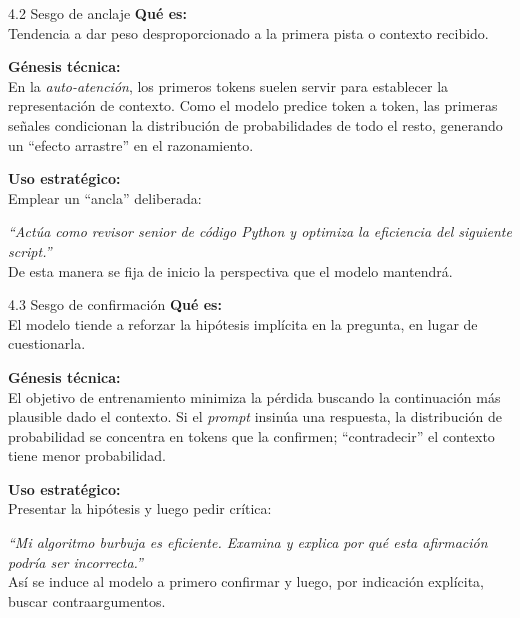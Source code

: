 \documentclass[xcolor=svgnames,t]{beamer}
\begin{document}
\begin{frame}{4.2 Sesgo de anclaje}
\justifying
\textbf{Qué es:}\\
Tendencia a dar peso desproporcionado a la primera pista o contexto recibido.

\medskip
\textbf{Génesis técnica:}\\
En la \textit{auto-atención}, los primeros tokens suelen servir para establecer la representación de contexto. Como el modelo predice token a token, las primeras señales condicionan la distribución de probabilidades de todo el resto, generando un “efecto arrastre” en el razonamiento.

\medskip
\textbf{Uso estratégico:}\\
Emplear un “ancla” deliberada:

\medskip
\textit{“Actúa como revisor senior de código Python y optimiza la eficiencia del siguiente script.”}\\
De esta manera se fija de inicio la perspectiva que el modelo mantendrá.
\end{frame}

\begin{frame}{4.3 Sesgo de confirmación}
\justifying
\textbf{Qué es:}\\
El modelo tiende a reforzar la hipótesis implícita en la pregunta, en lugar de cuestionarla.

\medskip
\textbf{Génesis técnica:}\\
El objetivo de entrenamiento minimiza la pérdida buscando la continuación más plausible dado el contexto. Si el \textit{prompt} insinúa una respuesta, la distribución de probabilidad se concentra en tokens que la confirmen; “contradecir” el contexto tiene menor probabilidad.

\medskip
\textbf{Uso estratégico:}\\
Presentar la hipótesis y luego pedir crítica:

\medskip
\textit{“Mi algoritmo burbuja es eficiente. Examina y explica por qué esta afirmación podría ser incorrecta.”}\\
Así se induce al modelo a primero confirmar y luego, por indicación explícita, buscar contraargumentos.
\end{frame}
\end{document}
